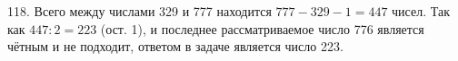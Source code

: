 118. Всего между числами 329 и 777 находится $777-329-1=447$ чисел. Так как $447:2=223$ (ост. 1), и последнее рассматриваемое число 776 является чётным и не подходит, ответом в задаче является число 223.\\
